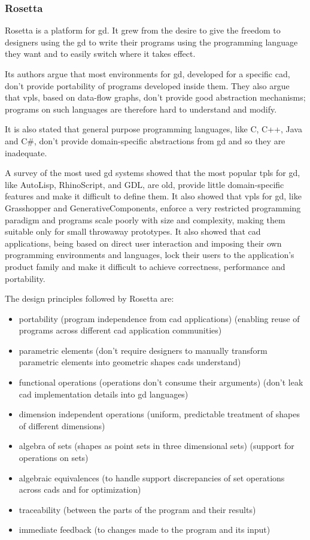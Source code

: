\documentclass{./llncs2e/llncs}
\begin{document}
\subsubsection{Rosetta\cite{de2012modern}}
	Rosetta is a platform for \ac{gd}.
	It grew from the desire to give the freedom to designers using the \ac{gd} to write their programs using the programming language they want and to easily switch where it takes effect.
	
	Its authors argue that most environments for \ac{gd}, developed for a specific \ac{cad}, don't provide portability of programs developed inside them.
	They also argue that \ac{vpl}s, based on data-flow graphs, don't provide good abstraction mechanisms; programs on such languages are therefore hard to understand and modify.
	
	It is also stated that general purpose programming languages, like C, C++, Java and C\#, don't provide domain-specific abstractions from \ac{gd} and so they are inadequate.
	
	A survey of the most used \ac{gd} systems showed that the most popular \ac{tpl}s for \ac{gd}, like AutoLisp, RhinoScript, and GDL, are old, provide little domain-specific features and make it difficult to define them.
	It also showed that \ac{vpl}s for \ac{gd}, like Grasshopper and GenerativeComponents, enforce a very restricted programming paradigm and programs scale poorly with size and complexity, making them suitable only for small throwaway prototypes. 
	It also showed that \ac{cad} applications, being based on direct user interaction and imposing their own programming environments and languages, lock their users to the application's product family and make it difficult to achieve correctness, performance and portability.
	
	The design principles followed by Rosetta are:
	\begin{itemize}
		\item portability (program independence from \ac{cad} applications) (enabling reuse of programs across different \ac{cad} application communities)
		\item parametric elements (don't require designers to manually transform parametric elements into geometric shapes \ac{cad}s understand)
		\item functional operations (operations don't consume their arguments) (don't leak \ac{cad} implementation details into \ac{gd} languages)
		\item dimension independent operations (uniform, predictable treatment of shapes of different dimensions)
		\item algebra of sets (shapes as point sets in three dimensional sets) (support for operations on sets)
		\item algebraic equivalences (to handle support discrepancies of set operations across \ac{cad}s and for optimization)
		\item traceability (between the parts of the program and their results)
		\item immediate feedback (to changes made to the program and its input)
	\end{itemize}
	
\end{document}
